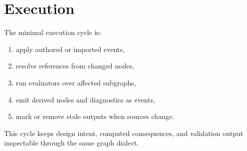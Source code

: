 \documentclass[11pt]{article}
\begin{document}
\clearpage
\section{Execution}

The minimal execution cycle is:

\begin{enumerate}
  \item apply authored or imported events,
  \item resolve references from changed nodes,
  \item run evaluators over affected subgraphs,
  \item emit derived nodes and diagnostics as events,
  \item mark or remove stale outputs when sources change.
\end{enumerate}

This cycle keeps design intent, computed consequences, and validation output inspectable through the same graph dialect.
\end{document}
